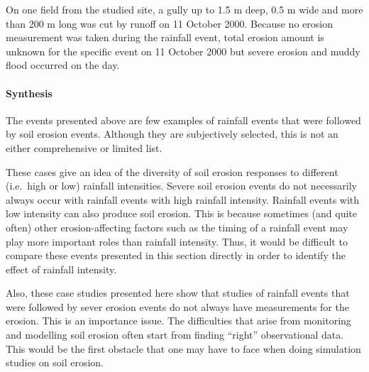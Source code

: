 On one field from the studied site, a gully up to 1.5 m deep, 0.5 m wide and
more than 200 m long was cut by runoff on 11 October 2000. Because no erosion
measurement was taken during the rainfall event, total erosion amount is
unknown for the specific event on 11 October 2000 but severe erosion and muddy
flood occurred on the day. 

\paragraph{Synthesis}
The events presented above are few examples of rainfall events that were
followed by soil erosion events. Although they are subjectively selected, this
is not an either comprehensive or limited list.

These cases give an idea of the diversity of soil erosion responses
to different (i.e.\ high or low) rainfall intensities. Severe soil erosion
events do not necessarily always occur with rainfall events with high rainfall
intensity. Rainfall events with low intensity can also produce soil erosion.
This is because sometimes (and quite often) other erosion-affecting factors such
as the timing of a rainfall event may play more important roles than rainfall
intensity. Thus, it would be difficult to compare these events presented in this
section directly in order to identify the effect of rainfall intensity.

Also, these case studies presented here show that studies of rainfall events
that were followed by sever erosion events do not always have measurements for
the erosion. This is an importance issue. The difficulties that arise from
monitoring and modelling soil erosion often start from finding ``right''
observational data. This would be the first obstacle that one may have to face
when doing simulation studies on soil erosion.

